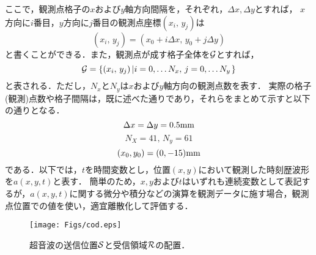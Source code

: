 ここで，観測点格子の$x$および$y$軸方向間隔を，それぞれ，$\Delta x,\Delta y$とすれば，
$x$方向に$i$番目，$y$方向に$j$番目の観測点座標$(x_i,\, y_j)$は
\begin{equation}
	(x_i,\, y_j)=(x_0+i\Delta x,\, y_0+j\Delta y)
	\label{eqn:x_ij}
\end{equation}
と書くことができる．また，観測点が成す格子全体を${\cal G}$とすれば，
\begin{equation}
	{\cal G} = \left\{ 
	(x_i,\, y_j)\left| i=0,\dots N_x, \, j=0,\dots N_y  \right.
	\right\}
	\label{eqn:Grid}
\end{equation}
と表される．ただし，$N_x$と$N_y$は$x$および$y$軸方向の観測点数を表す．
実際の格子(観測)点数や格子間隔は，既に述べた通りであり，それらをまとめて示すと以下の通りとなる．
\begin{equation}
	\Delta x=\Delta y=0.5 {\rm mm}
	\label{eqn:grid_prms}
\end{equation}
\begin{equation}
	N_X=41, \, N_y=61
	\label{eqn:grid_nums}
\end{equation}
\begin{equation}
	(x_0,y_0)=(0,-15){\rm mm}
	\label{eqn:grid_corner}
\end{equation}
である．以下では，$t$を時間変数とし，位置$(x,y)$において観測した時刻歴波形を$a(x,y,t)$と表す．
簡単のため，$x,y$および$t$はいずれも連続変数として表記するが，$a(x,y,t)$に関する微分や積分などの演算を観測データに施す場合，観測点位置での値を使い，適宜離散化して評価する．
\begin{figure}[t]
\begin{center}
\texttt{[image: Figs/cod.eps]}
\caption{
	超音波の送信位置$\cal S$と受信領域$\cal R$の配置．
}
\label{fig:fig4}
\end{center}
\end{figure}
